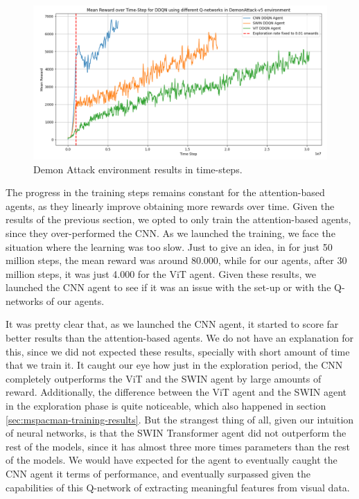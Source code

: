 \begin{figure}[!h]
	\centering
	\includegraphics[width=\linewidth]{figures/demon_attack_results_ts}
	\caption{Demon Attack environment results in time-steps. }
	\label{fig:demonattackresultsts}
\end{figure}

The progress in the training steps remains constant for the attention-based agents, as they linearly improve obtaining more rewards over time. Given the results of the previous section, we opted to only train the attention-based agents, since they over-performed the CNN. As we launched the training, we face the situation where the learning was too slow. Just to give an idea, in \cite{meng2024deep} for just 50 million steps, the mean reward was around 80.000, while for our agents, after 30 million steps, it was just 4.000 for the ViT agent. Given these results, we launched the CNN agent to see if it was an issue with the set-up or with the Q-networks of our agents. 

It was pretty clear that, as we launched the CNN agent, it started to score far better results than the attention-based agents. We do not have an explanation for this, since we did not expected these results, specially with short amount of time that we train it. It caught our eye how just in the exploration period, the CNN completely outperforms the ViT and the SWIN agent by large amounts of reward. Additionally, the difference between the ViT agent and the SWIN agent in the exploration phase is quite noticeable, which also happened in section \ref{sec:mspacman-training-results}. But the strangest thing of all, given our intuition of neural networks, is that the SWIN Transformer agent did not outperform the rest of the models, since it has almost three more times parameters than the rest of the models. We would have expected for the agent to eventually caught the CNN agent it terms of performance, and eventually surpassed given the capabilities of this Q-network of extracting meaningful features from visual data.

